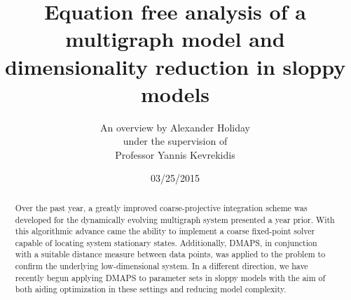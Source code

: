 \documentclass[12pt]{article}
\begin{document}
\title{\vspace{-1cm}Equation free analysis of a multigraph model and dimensionality reduction in sloppy models}
\author{\LARGE An overview by Alexander Holiday\vspace{3mm}\\\Large  under the supervision of\vspace{3mm}\\\LARGE  Professor Yannis Kevrekidis}
\date{03/25/2015}
\maketitle
\begin{spacing}{2}
\begin{abstract}
  Over the past year, a greatly improved coarse-projective integration scheme was developed for the dynamically evolving multigraph system presented a year prior. With this algorithmic advance came the ability to implement a coarse fixed-point solver capable of locating system stationary states. Additionally, DMAPS, in conjunction with a suitable distance measure between data points, was applied to the problem to confirm the underlying low-dimensional system. In a different direction, we have recently begun applying DMAPS to parameter sets in sloppy models with the aim of both aiding optimization in these settings and reducing model complexity.
\end{abstract}


\end{spacing}
\end{document}
